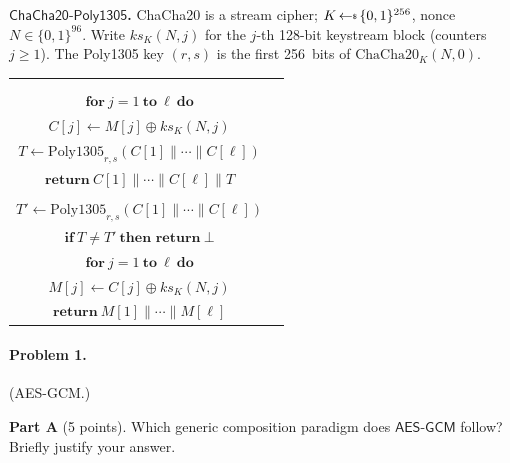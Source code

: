 \documentclass[11pt]{article}
\makeatletter
\newcommand{\getsr}{{{\,\leftarrow{\hspace*{-3pt}\raisebox{.75pt}{$\scriptscriptstyle\$$}}\,}}}
\newcommand{\bits}{\{0,1\}}
\newcommand{\calD}{{\cal D}}
\newcommand{\calE}{{\cal E}}
\newcommand{\gamesfontsize}{\small}
\newcommand{\hfpagess}[4]{
        \begin{tabular}{c@{\hspace*{.5em}}c}
        \framebox{\begin{minipage}[t]{#1\textwidth}\setstretch{1.2}\gamesfontsize #3 \end{minipage}}
        &
        \framebox{\begin{minipage}[t]{#2\textwidth}\setstretch{1.2}\gamesfontsize #4 \end{minipage}}
        \end{tabular}
    }
\newcommand{\Poly}{\mathrm{Poly1305}}
\newcommand{\ChaCha}{\mathrm{ChaCha20}}
\newcommand{\AESGCM}{\mathsf{AES\text{-}GCM}}
\newcommand{\CCP}{\mathsf{ChaCha20\text{-}Poly1305}}
\makeatother
\begin{document}
\bigskip

\noindent\textbf{$\CCP$.}\quad
ChaCha20 is a stream cipher; $K \getsr \bits^{256}$, nonce
$N \in \bits^{96}$.
Write $\mathit{ks}_K(N, j)$ for the $j$-th 128-bit keystream block
(counters $j \ge 1$).
The Poly1305 key $(r,s)$ is the first 256~bits of $\ChaCha_K(N,0)$.

{\hfuzz=3pt\begin{center}
\hfpagess{0.45}{0.49}{%
  \underline{\textbf{Alg} $\calE_K(N, M)$}\\
  \vspace*{-\topsep}
  \begin{tabbing}
  \hspace{0.8em}\=\hspace{1.2em}\=\kill
  \> $(r, s) \gets$ first $256$ bits of $\ChaCha_K(N, 0)$\\
  \> $\textbf{for}\ j = 1\ \textbf{to}\ \ell\ \textbf{do}$\\
  \>\> $C[j] \gets M[j] \oplus \mathit{ks}_K(N, j)$\\
  \> $T \gets \Poly_{r,s}(C[1]\|\cdots\|C[\ell])$\\
  \> $\textbf{return}\ C[1]\|\cdots\|C[\ell]\|T$
  \end{tabbing}
}{%
  \underline{\textbf{Alg} $\calD_K(N,\; C\|T)$}\\
  \vspace*{-\topsep}
  \begin{tabbing}
  \hspace{0.8em}\=\hspace{1.2em}\=\kill
  \> $(r, s) \gets$ first $256$ bits of $\ChaCha_K(N, 0)$\\
  \> $T' \gets \Poly_{r,s}(C[1]\|\cdots\|C[\ell])$\\
  \> $\textbf{if}\ T \ne T'\ \textbf{then return}\ \bot$\\
  \> $\textbf{for}\ j = 1\ \textbf{to}\ \ell\ \textbf{do}$\\
  \>\> $M[j] \gets C[j] \oplus \mathit{ks}_K(N, j)$\\
  \> $\textbf{return}\ M[1]\|\cdots\|M[\ell]$
  \end{tabbing}
}
\end{center}}

\bigskip


\paragraph*{Problem 1.} (AES-GCM.)

\noindent\textbf{Part A} (5 points).
Which generic composition paradigm does $\AESGCM$ follow? Briefly justify your answer.
\end{document}
